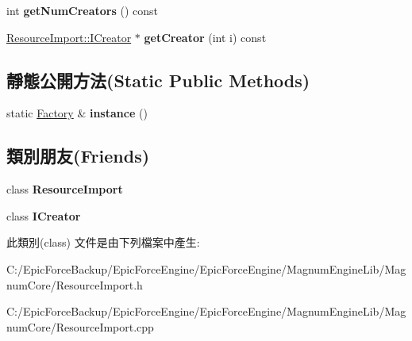 \begin{DoxyCompactItemize}
\item 
int {\bfseries get\+Num\+Creators} () const \hypertarget{class_magnum_1_1_resource_import_1_1_factory_aaae66f8e731aaf516bcca0fa1f601e50}{}\label{class_magnum_1_1_resource_import_1_1_factory_aaae66f8e731aaf516bcca0fa1f601e50}

\item 
\hyperlink{class_magnum_1_1_resource_import_1_1_i_creator}{Resource\+Import\+::\+I\+Creator} $\ast$ {\bfseries get\+Creator} (int i) const \hypertarget{class_magnum_1_1_resource_import_1_1_factory_a8f84cef3e70cc51e016af022e8e14ba4}{}\label{class_magnum_1_1_resource_import_1_1_factory_a8f84cef3e70cc51e016af022e8e14ba4}

\end{DoxyCompactItemize}
\subsection*{靜態公開方法(Static Public Methods)}
\begin{DoxyCompactItemize}
\item 
static \hyperlink{class_magnum_1_1_resource_import_1_1_factory}{Factory} \& {\bfseries instance} ()\hypertarget{class_magnum_1_1_resource_import_1_1_factory_afcb1db0ea0d0fe1a4a5c8604b8d926ad}{}\label{class_magnum_1_1_resource_import_1_1_factory_afcb1db0ea0d0fe1a4a5c8604b8d926ad}

\end{DoxyCompactItemize}
\subsection*{類別朋友(Friends)}
\begin{DoxyCompactItemize}
\item 
class {\bfseries Resource\+Import}\hypertarget{class_magnum_1_1_resource_import_1_1_factory_a886ab3c64485d3e65d51d9b87a500080}{}\label{class_magnum_1_1_resource_import_1_1_factory_a886ab3c64485d3e65d51d9b87a500080}

\item 
class {\bfseries I\+Creator}\hypertarget{class_magnum_1_1_resource_import_1_1_factory_a6d6e56ac47edfce9d2590e0757222ded}{}\label{class_magnum_1_1_resource_import_1_1_factory_a6d6e56ac47edfce9d2590e0757222ded}

\end{DoxyCompactItemize}


此類別(class) 文件是由下列檔案中產生\+:\begin{DoxyCompactItemize}
\item 
C\+:/\+Epic\+Force\+Backup/\+Epic\+Force\+Engine/\+Epic\+Force\+Engine/\+Magnum\+Engine\+Lib/\+Magnum\+Core/Resource\+Import.\+h\item 
C\+:/\+Epic\+Force\+Backup/\+Epic\+Force\+Engine/\+Epic\+Force\+Engine/\+Magnum\+Engine\+Lib/\+Magnum\+Core/Resource\+Import.\+cpp\end{DoxyCompactItemize}

